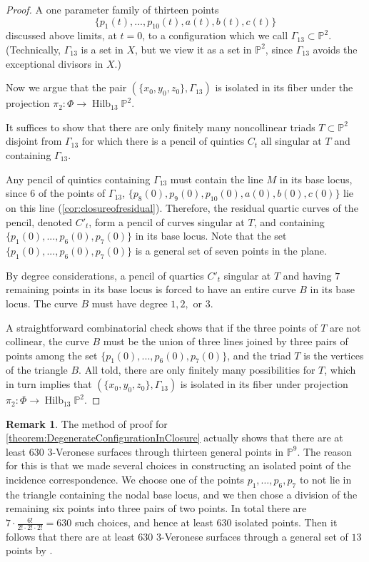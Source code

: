 \documentclass[reqno, 11pt]{amsart}
\theoremstyle{definition}
\theoremstyle{remark}
\numberwithin{equation}{section}
\numberwithin{thm}{section}
\numberwithin{prop}{section}
\numberwithin{lem}{section}
\numberwithin{cor}{section}
\numberwithin{conj}{section}
\numberwithin{defn}{section}
\renewcommand{\to}{\longrightarrow}
\newcommand {\from}{{\colon}}
\theoremstyle{plain}
\theoremstyle{definition}
\newtheorem{remark}[theorem]{Remark}
\newcommand\bp{{\mathbb P}}
\DeclareMathOperator\Hilb{Hilb}
\begin{document}
\begin{proof}	
	A one parameter family of thirteen points \[\{p_{1}(t), ... , p_{10}(t), a(t), b(t), c(t)\}\] discussed above limits, at $t=0$, to a configuration which we call $\Gamma_{13} \subset \bp^{2}$.  (Technically, $\Gamma_{13}$ is a set in $X$, but we view it as a set in $\bp^{2}$, since $\Gamma_{13}$ avoids the exceptional divisors in $X$.)


Now we argue that the pair $(\{x_{0},y_{0},z_{0}\}, \Gamma_{13})$ is isolated in its fiber under the projection $\pi_{2} \from \Phi \to \Hilb_{13}\bp^2$.

It suffices to show that there are only finitely many noncollinear triads $T \subset \bp^{2}$ disjoint from $\Gamma_{13}$ for which there is a pencil of quintics $C_{t}$ all singular at $T$ and containing $\Gamma_{13}$.

Any pencil of quintics containing $\Gamma_{13}$ must contain the line $M$ in its base locus, since $6$ of the points of $\Gamma_{13}$, $\{p_{8}(0), p_{9}(0), p_{10}(0), a(0), b(0), c(0)\}$ lie on this line (\autoref{cor:closureofresidual}). Therefore, the residual quartic curves of the pencil, denoted $C'_{t}$, form a pencil of curves singular at $T$, and containing $\{p_{1}(0), ... , p_{6}(0), p_{7}(0)\}$ in its base locus.  Note that the set $\{p_{1}(0), ... , p_{6}(0), p_{7}(0)\}$ is a general set of seven points in the plane.

By degree considerations, a pencil of quartics $C'_{t}$ singular at $T$ and having $7$ remaining points in its base locus is forced to have an entire curve $B$ in its base locus.   The curve $B$ must have degree $1, 2,$ or $3$.  

A straightforward combinatorial check shows that if the three points of $T$ are not collinear, the curve $B$ must be the union of three lines joined by three pairs of points among the set $\{p_{1}(0) ,... ,p_{6}(0), p_{7}(0)\}$, and the triad $T$ is the vertices of the triangle $B$.  All told, there are only finitely many possibilities for $T$, which in turn implies that $(\{x_{0},y_{0},z_{0}\}, \Gamma_{13})$ is isolated in its fiber under projection $\pi_{2} \from \Phi \to \Hilb_{13}\bp^2$. 
\end{proof}

\begin{remark}\label{remark:630}
The method of proof for \autoref{theorem:DegenerateConfigurationInClosure} actually shows that there are at least $630$  $3$-Veronese surfaces through thirteen general points in $\bp^{9}$. The reason for this is that we made several
choices in constructing an isolated point of the incidence correspondence.
We choose one of the points $p_1, \ldots, p_6, p_7$ to not lie
in the triangle containing the nodal base locus, and we then chose a division
of the remaining six points into three pairs of two points.
In total there are $7 \cdot \frac{6!}{2! \cdot 2! \cdot 2!} = 630$
such choices, and hence at least $630$ isolated points.
Then it follows that there are at least $630$ $3$-Veronese surfaces
through a general set of $13$ points by
\cite[II.6.3, Theorem 3]{shafarevich:basic-algebraic-geometry-1}.
\end{remark}
\end{document}
